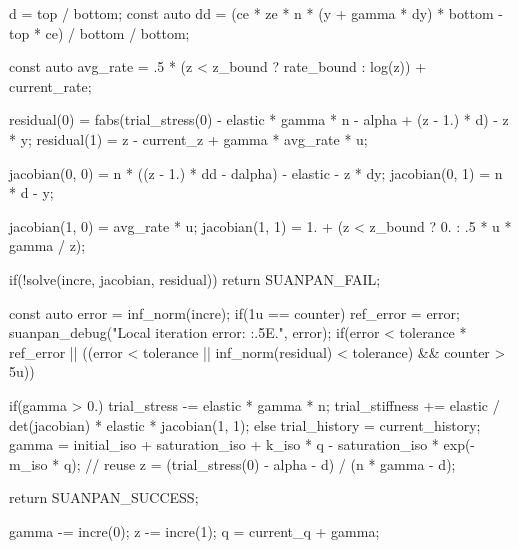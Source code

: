 \begin{cppcode}
{{        d = top / bottom;
        const auto dd = (ce * ze * n * (y + gamma * dy) * bottom - top * ce) / bottom / bottom;

        const auto avg_rate = .5 * (z < z_bound ? rate_bound : log(z)) + current_rate;

        residual(0) = fabs(trial_stress(0) - elastic * gamma * n - alpha + (z - 1.) * d) - z * y;
        residual(1) = z - current_z + gamma * avg_rate * u;

        jacobian(0, 0) = n * ((z - 1.) * dd - dalpha) - elastic - z * dy;
        jacobian(0, 1) = n * d - y;

        jacobian(1, 0) = avg_rate * u;
        jacobian(1, 1) = 1. + (z < z_bound ? 0. : .5 * u * gamma / z);

        if(!solve(incre, jacobian, residual)) return SUANPAN_FAIL;

        const auto error = inf_norm(incre);
        if(1u == counter) ref_error = error;
        suanpan_debug("Local iteration error: {:.5E}.\n", error);
        if(error < tolerance * ref_error || ((error < tolerance || inf_norm(residual) < tolerance) && counter > 5u)) {
            if(gamma > 0.) {
                trial_stress -= elastic * gamma * n;
                trial_stiffness += elastic / det(jacobian) * elastic * jacobian(1, 1);
            }
            else {
                trial_history = current_history;
                gamma = initial_iso + saturation_iso + k_iso * q - saturation_iso * exp(-m_iso * q); // reuse
                z = (trial_stress(0) - alpha - d) / (n * gamma - d);
            }

            return SUANPAN_SUCCESS;
        }

        gamma -= incre(0);
        z -= incre(1);
        q = current_q + gamma;
    }
}
\end{cppcode}
